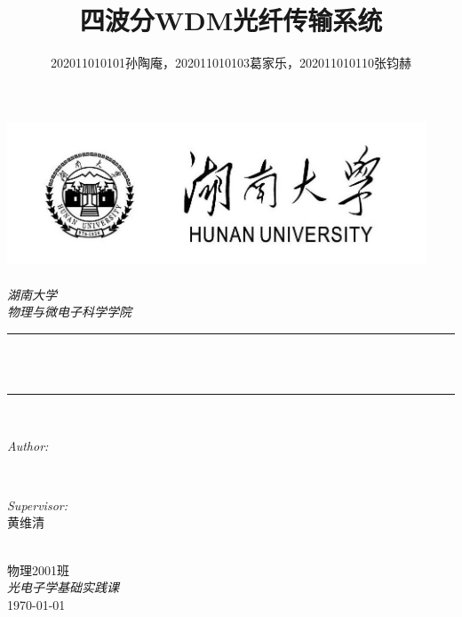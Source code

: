 \documentclass[12pt]{article}
\title{四波分WDM光纤传输系统}
\author{202011010101孙陶庵，202011010103葛家乐，202011010110张钧赫}
\begin{document}
    \renewcommand\theequation{\thesubsection.\arabic{equation}}
    \newtheorem{mythm}{定理}[section]  %

    \begin{titlepage}
      \newcommand{\HRule}{\rule{\linewidth}{0.5mm}}
      \includegraphics[width=12.5cm]{sc_logo.jpg}\\[0cm] 
      \center 
      \quad\\[1cm]
      \textsl{\Large 湖南大学 }\\[0.5cm] 
      \textsl{\large 物理与微电子科学学院}\\[-0.5cm] 
      \makeatletter
      \HRule \\[0.4cm]
      { \huge \bfseries \@title}\\[0.4cm] 
      \HRule \\[1.5cm]
      \begin{minipage}{0.4\textwidth}
        \begin{flushleft} \large
          \emph{Author:}\\
          \vspace{0pt} %
          \@author 
        \end{flushleft}
      \end{minipage}
      ~
      \begin{minipage}{0.4\textwidth}
        \begin{flushright} \large
          \emph{Supervisor:} \\
          \vspace{0pt} %
          \textup{黄维清}
        \end{flushright}
      \end{minipage}\\[3cm]
      \makeatother
      {\large 物理2001班}\\[0.5cm]
      {\large \emph{光电子学基础实践课}}\\[0.5cm]
      {\large \today}\\[2cm] 
      \vfill 
    \end{titlepage}
\thispagestyle{empty}
\clearpage     %
\tableofcontents        %
\clearpage     %
\end{document}
